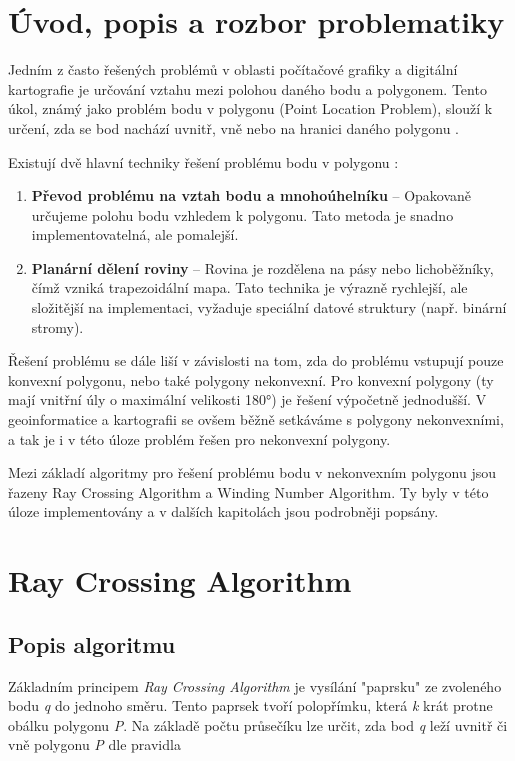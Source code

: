 \documentclass[a4paper,12pt]{article}
\begin{document}
\section{Úvod, popis a rozbor problematiky}

Jedním z často řešených problémů v oblasti počítačové grafiky a digitální kartografie je určování vztahu mezi polohou daného bodu a polygonem. Tento úkol, známý jako problém bodu v polygonu (Point Location Problem), slouží k určení, zda se bod nachází uvnitř, vně nebo na hranici daného polygonu \parencite{bayer_prednaska}.

Existují dvě hlavní techniky řešení problému bodu v polygonu \parencite{bayer_prednaska}:

\begin{enumerate}
    \item \textbf{Převod problému na vztah bodu a mnohoúhelníku} – Opakovaně určujeme polohu bodu vzhledem k polygonu. Tato metoda je snadno implementovatelná, ale pomalejší.
    \item \textbf{Planární dělení roviny} – Rovina je rozdělena na pásy nebo lichoběžníky, čímž vzniká trapezoidální mapa. Tato technika je výrazně rychlejší, ale složitější na implementaci, vyžaduje speciální datové struktury (např. binární stromy).
\end{enumerate}

Řešení problému se dále liší v závislosti na tom, zda do problému vstupují pouze konvexní polygonu, nebo také polygony nekonvexní. Pro konvexní polygony (ty mají vnitřní úly o maximální velikosti 180°) je řešení výpočetně jednodušší. V geoinformatice a kartografii se ovšem běžně setkáváme s polygony nekonvexními, a tak je i v této úloze problém řešen pro nekonvexní polygony.

Mezi základí algoritmy pro řešení problému bodu v nekonvexním polygonu jsou řazeny Ray Crossing Algorithm a Winding Number Algorithm. Ty byly v této úloze implementovány a v dalších kapitolách jsou podrobněji popsány.



\section{Ray Crossing Algorithm}
\subsection{Popis algoritmu}

Základním principem \textit{Ray Crossing Algorithm} je vysílání "paprsku" ze zvoleného bodu \textit{q} do jednoho směru. Tento paprsek tvoří polopřímku, která \textit{k} krát protne obálku polygonu \textit{P}. Na základě počtu průsečíku lze určit, zda bod \textit{q} leží uvnitř či vně polygonu \textit{P} dle pravidla
\end{document}
